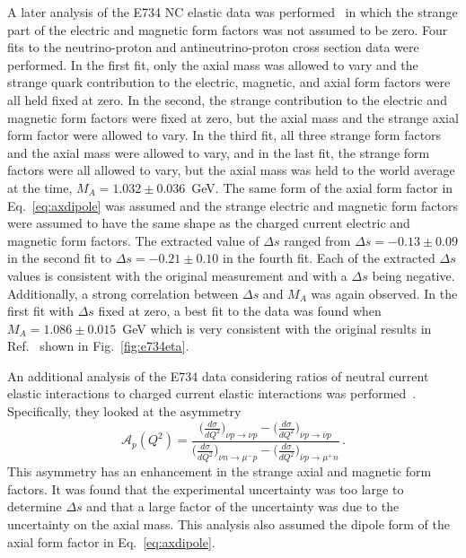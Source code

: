   A later analysis of the E734 NC elastic data was
  performed~\cite{Garvey:1992cg} in which the strange part of the electric
  and magnetic form factors was not assumed to be zero. Four fits to the
  neutrino-proton and antineutrino-proton cross section data were performed.
  In the first fit, only the axial mass was allowed to vary and the strange
  quark contribution to the electric, magnetic, and axial form factors were
  all held fixed at zero. In the second, the strange contribution to the
  electric and magnetic form factors were fixed at zero, but the axial mass
  and the strange axial form factor were allowed to vary. In the third fit,
  all three strange form factors and the axial mass were allowed to vary, and
  in the last fit, the strange form factors were all allowed to vary, but the
  axial mass was held to the world average at the time, $M_A =
  1.032\pm0.036$~GeV. The same form of the axial form factor in
  Eq.~\ref{eq:axdipole} was assumed and the strange electric and magnetic
  form factors were assumed to have the same shape as the charged current
  electric and magnetic form factors. The extracted value of $\Delta s$
  ranged from $\Delta s = -0.13 \pm 0.09$ in the second fit to $\Delta s =
  -0.21 \pm 0.10$ in the fourth fit.  Each of the extracted $\Delta s$ values
  is consistent with the original measurement and with a $\Delta s$ being
  negative.  Additionally, a strong correlation between $\Delta s$ and $M_A$
  was again observed. In the first fit with $\Delta s$ fixed at zero, a best
  fit to the data was found when $M_A = 1.086 \pm 0.015$~GeV which is very
  consistent with the original results in Ref.~\cite{Ahrens:1986xe} shown in
  Fig.~\ref{fig:e734eta}.

  An additional analysis of the E734 data considering ratios of neutral
  current elastic interactions to charged current elastic interactions was
  performed~\cite{Alberico:1998qw}. Specifically, they looked at the
  asymmetry
  \begin{equation*}
    \mathcal{A}_p(Q^2) = \frac{\Big(\frac{d\sigma}{dQ^2}\Big)_{\nu p \rightarrow \nu p} - \Big(\frac{d\sigma}{dQ^2}\Big)_{\bar{\nu} p \rightarrow \bar{\nu} p} }{\Big(\frac{d\sigma}{dQ^2}\Big)_{\nu n \rightarrow \mu^- p} - \Big(\frac{d\sigma}{dQ^2}\Big)_{\bar{\nu} p \rightarrow \mu^+ n}} \,.
  \end{equation*}
  This asymmetry has an enhancement in the strange axial and magnetic form
  factors. It was found that the experimental uncertainty was too large to
  determine $\Delta s$ and that a large factor of the uncertainty was due to
  the uncertainty on the axial mass. This analysis also assumed the dipole
  form of the axial form factor in Eq.~\ref{eq:axdipole}.


